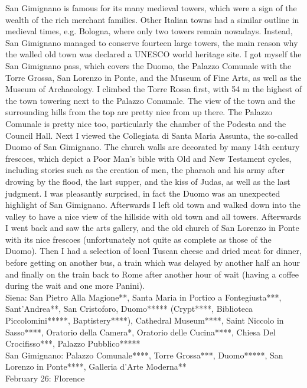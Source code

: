 San Gimignano is famous for its many medieval towers, which were a sign of the wealth of the rich merchant families. Other Italian towns had a similar outline in medieval times, e.g. Bologna, where only two towers remain nowadays. Instead, San Gimignano managed to conserve fourteen large towers, the main reason why the walled old town was declared a UNESCO world heritage site. I got myself the San Gimignano pass, which covers the Duomo, the Palazzo Comunale with the Torre Grossa, San Lorenzo in Ponte, and the Museum of Fine Arts, as well as the Museum of Archaeology. I climbed the Torre Rossa first, with 54 m the highest of the town towering next to the Palazzo Comunale. The view of the town and the surrounding hills from the top are pretty nice from up there. The Palazzo Comunale is pretty nice too, particularly the chamber of the Podesta and the Council Hall. Next I viewed the Collegiata di Santa Maria Assunta, the so-called Duomo of San Gimignano. The church walls are decorated by many 14th century frescoes, which depict a Poor Man's bible with Old and New Testament cycles, including stories such as the creation of men, the pharaoh and his army after drowing by the flood, the last supper, and the kiss of Judas, as well as the last judgment. I was pleasantly surprised, in fact the Duomo was an unexpected highlight of San Gimignano. Afterwards I left old town and walked down into the valley to have a nice view of the hillside with old town and all towers. Afterwards I went back and saw the arts gallery, and the old church of San Lorenzo in Ponte with its nice frescoes (unfortunately not quite as complete as those of the Duomo). Then I had a selection of local Tuscan cheese and dried meat for dinner, before getting on another bus, a train which was delayed by another half an hour and finally on the train back to Rome after another hour of wait (having a coffee during the wait and one more Panini).\\

Siena: San Pietro Alla Magione**, Santa Maria in Portico a Fontegiusta***,  Sant'Andrea**, San Cristoforo, Duomo***** (Crypt****, Biblioteca Piccolomini*****, Baptistery****), Cathedral Museum****, Saint Niccolo in Sasso****, Oratorio della Camera*, Oratorio delle Cucina****, Chiesa Del Crocifisso***, Palazzo Pubblico*****\\%
San Gimignano: Palazzo Comunale****, Torre Grossa***, Duomo*****, San Lorenzo in Ponte****, Galleria d'Arte Moderna**\\%

February 26: Florence\\%

